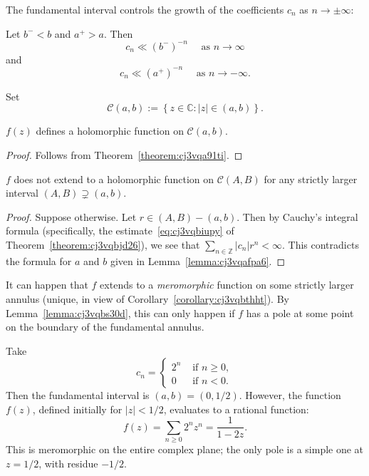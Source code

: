 \documentclass[reqno]{amsart}  \numberwithin{theorem}{section} \numberwithin{equation}{section}
\begin{document}
The fundamental interval controls the growth of the coefficients $c_n$ as $n \rightarrow \pm \infty$:
\begin{lemma}
  Let $b^- < b$ and $a^+ > a$.  Then
  \begin{equation*}
    c_n \ll {(b^-)}^{-n} \quad \text{ as } n \rightarrow \infty
  \end{equation*}
  and
  \begin{equation*}
    c_n \ll {(a^+)}^{-n} \quad \text{ as } n \rightarrow -\infty.
  \end{equation*}
\end{lemma}

Set
\begin{equation*}
\mathcal{C} (a, b) := \left\{ z \in \mathbb{C} : \lvert z  \rvert \in (a,b) \right\}.
\end{equation*}

\begin{lemma}
$f(z)$ defines a holomorphic function on $\mathcal{C}(a,b)$.
\end{lemma}
\begin{proof}
  Follows from Theorem~\ref{theorem:cj3vqa91ti}.
\end{proof}

\begin{lemma}\label{lemma:cj3vqbs30d}
$f$ does not extend to a holomorphic function on $\mathcal{C}(A,B)$ for any strictly larger interval $(A,B) \supsetneq (a,b)$.
\end{lemma}
\begin{proof}
  Suppose otherwise.  Let $r \in (A,B) - (a,b)$.  Then by Cauchy's integral formula (specifically, the estimate~\eqref{eq:cj3vqbiupy} of Theorem~\ref{theorem:cj3vqbjd26}), we see that $\sum_{n \in \mathbb{Z}} \lvert c_n \rvert r^n < \infty$.  This contradicts the formula for $a$ and $b$ given in Lemma~\ref{lemma:cj3vqafpa6}.
\end{proof}

\begin{note}
  It can happen that $f$ extends to a \emph{meromorphic} function on some strictly larger annulus (unique, in view of Corollary~\ref{corollary:cj3vqbthht}).  By Lemma~\ref{lemma:cj3vqbs30d}, this can only happen if $f$ has a pole at some point on the boundary of the fundamental annulus.
\end{note}

\begin{example}
  Take
  \begin{equation*}
    c_n =
    \begin{cases}
      2^n & \text{ if } n \geq 0, \\
      0 & \text{ if } n < 0.
    \end{cases}
  \end{equation*}
  Then the fundamental interval is $(a, b) = (0, 1/2)$.  However, the function $f(z)$, defined initially for $\lvert z \rvert < 1/2$, evaluates to a rational function:
  \begin{equation*}
    f(z) = \sum_{n \geq 0} 2^n z^n
    = \frac{1}{1 - 2 z}.
  \end{equation*}
  This is meromorphic on the entire complex plane; the only pole is a simple one at $z = 1/2$, with residue $-1/2$.
\end{example}
\end{document}
